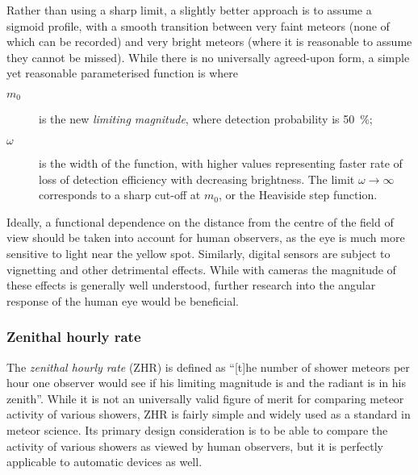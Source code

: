             Rather than using a sharp limit, a slightly better approach is to assume a sigmoid profile,
            with a smooth transition between very faint meteors (none of which can be recorded)
            and very bright meteors (where it is reasonable to assume they cannot be missed).
            While there is no universally agreed-upon form, a simple yet reasonable parameterised function is
            where
            \begin{description}
                \item[$m_0$]    is the new \emph{limiting magnitude}, where detection probability is \SI{50}{\percent};
                \item[$\omega$] is the width of the function, with higher values representing
                    faster rate of loss of detection efficiency with decreasing brightness.
                    The limit $\omega \to \infty$ corresponds to a sharp cut-off at $m_0$,
                    or the Heaviside step function.
            \end{description}

            Ideally, a functional dependence on the distance from the centre of the field
            of view should be taken into account for human observers, as the eye is much more
            sensitive to light near the yellow spot.
            Similarly, digital sensors are subject to vignetting and other detrimental effects.
            While with cameras the magnitude of these effects is generally well understood,
            further research into the angular response of the human eye would be beneficial.

        \subsubsection{Zenithal hourly rate} \label{msaz}
            The \emph{zenithal hourly rate} (ZHR) is defined as ``[t]he number of shower meteors per hour
            one observer would see if his limiting magnitude is  and the radiant is in his zenith''.
            While it is not an universally valid figure of merit for comparing meteor activity of various showers,
            ZHR is fairly simple and widely used as a standard in meteor science.
            Its primary design consideration is to be able to compare the activity of various showers
            as viewed by human observers, but it is perfectly applicable to automatic devices as well.


